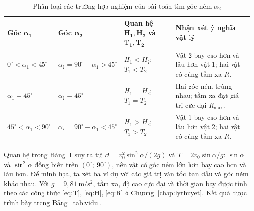 \begin{table}[H]
  \centering{}
  \caption{Phân loại các trường hợp nghiệm của bài toán tìm góc ném $\alpha_2$}
  \label{tab:phanloai}
  \renewcommand{\arraystretch}{1.35}
  \begin{tabular}{|>{\centering\arraybackslash}m{2.9cm}|>{\centering\arraybackslash}m{3.8cm}|>{\centering\arraybackslash}m{2.5cm}|>{\raggedright\arraybackslash}m{5.0cm}|}
    \hline
    \textbf{Góc $\boldsymbol{\alpha_1}$} & \textbf{Góc $\boldsymbol{\alpha_2}$} & \textbf{Quan hệ $\boldsymbol{H_1, H_2}$ và $\boldsymbol{T_1, T_2}$} & \centering\arraybackslash\textbf{Nhận xét ý nghĩa vật lý} \\ \hline
    $0^\circ < \alpha_1 < 45^\circ$  & $\alpha_2 = 90^\circ - \alpha_1 > 45^\circ$ & $H_1 < H_2$; $T_1 < T_2$ & Vật 2 bay cao hơn và lâu hơn vật 1; hai vật có cùng tầm xa $R$. \\ \hline
    $\alpha_1 = 45^\circ$            & $\alpha_2 = 45^\circ$                       & $H_1 = H_2$; $T_1 = T_2$ & Hai góc ném trùng nhau; tầm xa đạt giá trị cực đại $R_{\max}$. \\ \hline
    $45^\circ < \alpha_1 < 90^\circ$ & $\alpha_2 = 90^\circ - \alpha_1 < 45^\circ$ & $H_1 > H_2$; $T_1 > T_2$ & Vật 1 bay cao hơn và lâu hơn vật 2; hai vật có cùng tầm xa $R$. \\ \hline
  \end{tabular}
\end{table}

Quan hệ trong Bảng~\ref{tab:phanloai} suy ra từ $H = v_0^2\sin^2\alpha/(2g)$ và $T = 2v_0\sin\alpha/g$: $\sin\alpha$ và $\sin^2\alpha$ đồng biến trên $(0^\circ;\ 90^\circ)$, nên vật có góc ném lớn hơn bay cao hơn và lâu hơn. Để minh họa, ta xét ba ví dụ với các giá trị vận tốc ban đầu và góc ném khác nhau. Với $g = 9{,}81~\mathrm{m/s^2}$, tầm xa, độ cao cực đại và thời gian bay được tính theo các công thức \eqref{eq:T}, \eqref{eq:H}, \eqref{eq:R} ở Chương~\ref{chap:lythuyet}. Kết quả được trình bày trong Bảng~\ref{tab:vidu}.

